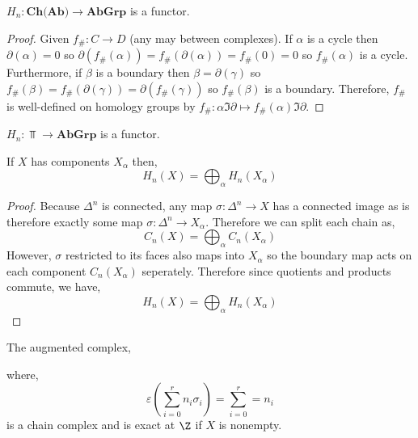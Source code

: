 \documentclass[12pt]{extarticle}
\begin{document}
\begin{lemma}
$H_n : \textbf{Ch(Ab)} \to \mathbf{AbGrp}$ is a functor.
\end{lemma}

\begin{proof}
Given $f_\# : C \to D$ (any may between complexes). If $\alpha$ is a cycle then $\partial(\alpha) = 0$ so $\partial(f_\#(\alpha)) = f_\#(\partial(\alpha)) = f_\#(0) = 0$ so $f_\#(\alpha)$ is a cycle. Furthermore, if $\beta$ is a boundary then $\beta = \partial(\gamma)$ so $f_\#(\beta) = f_\#(\partial(\gamma)) = \partial(f_\#(\gamma))$ so $f_\#(\beta)$ is a boundary. Therefore, $f_\#$ is well-defined on homology groups by $f_\# : \alpha \Im{\partial} \mapsto f_\#(\alpha) \Im{\partial}$. 
\end{proof}

\begin{corollary}
$H_n : \Top \to \mathbf{AbGrp}$ is a functor.
\end{corollary}

\begin{proposition}
If $X$ has components $X_\alpha$ then,
\[H_n(X) = \bigoplus_{\alpha} H_n(X_\alpha) \] 
\end{proposition}

\begin{proof}
Because $\Delta^n$ is connected, any map $\sigma : \Delta^n \to X$ has a connected image as is therefore exactly some map $\sigma : \Delta^n \to X_\alpha$. Therefore we can split each chain as,
\[ C_n(X) = \bigoplus_{\alpha} C_n(X_\alpha) \]
However, $\sigma$ restricted to its faces also maps into $X_\alpha$ so the boundary map acts on each component $C_n(X_\alpha)$ seperately. Therefore since quotients and products commute, we have,
\[H_n(X) = \bigoplus_{\alpha} H_n(X_\alpha) \] 
\end{proof}

\begin{proposition}
The augmented complex,
\begin{center}
\end{center}
where,
\[ \varepsilon\left(\sum_{i = 0}^r n_i \sigma_i \right) = \sum_{i = 0}^r = n_i \] 
is a chain complex and is exact at $\Z$ if $X$ is nonempty.
\end{proposition}
\end{document}
